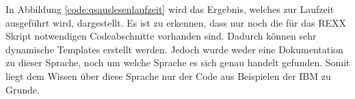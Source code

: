 \begin{minipage}{\linewidth}

\end{minipage}

In Abbildung \ref{code:qsauslesenlaufzeit} wird das Ergebnis, welches zur Laufzeit ausgeführt wird, dargestellt.
Es ist zu erkennen, dass nur noch die für das REXX Skript notwendigen Codeabschnitte vorhanden sind.
Dadurch können sehr dynamische Templates erstellt werden.
Jedoch wurde weder eine Dokumentation zu dieser Sprache, noch um welche Sprache es sich genau handelt gefunden.
Somit liegt dem Wissen über diese Sprache nur der Code aus Beispielen der IBM zu Grunde.

\begin{minipage}{\linewidth}

\end{minipage}

